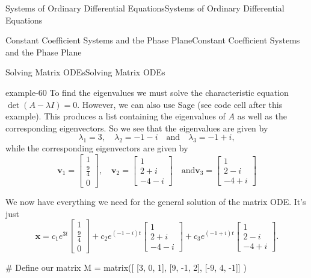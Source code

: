 \documentclass[10pt,]{book}
\numberwithin{equation}{section}
\renewcommand{\vec}[1]{\mathbf{#1}}
\begin{document}
\begin{chapterptx}{Systems of Ordinary Differential Equations}{}{Systems of Ordinary Differential Equations}{}{}
\begin{sectionptx}{Constant Coefficient Systems and the Phase Plane}{}{Constant Coefficient Systems and the Phase Plane}{}{}
\begin{subsectionptx}{Solving Matrix ODEs}{}{Solving Matrix ODEs}{}{}
\begin{example}{}{example-60}
\hypertarget{p-357}{}%
To find the eigenvalues we must solve the characteristic equation \(\det(A-\lambda I)=0\). However, we can also use Sage (see code cell after this example). This produces a list containing the eigenvalues of \(A\) as well as the corresponding eigenvectors. So we see that the eigenvalues are given by%
\begin{equation*}
\lambda_{1} = 3, \quad\lambda_{2} = -1 - i\quad\text{and}\quad\lambda_{3} = -1 + i,
\end{equation*}
while the corresponding eigenvectors are given by%
\begin{equation*}
\vec{v}_{1} = \begin{bmatrix}1 \\ \frac{9}{4} \\ 0\end{bmatrix}, \quad\vec{v}_{2} = \begin{bmatrix} 1 \\ 2 + i \\ -4 - i \end{bmatrix}\quad\text{and}\vec{v}_{3} = \begin{bmatrix} 1 \\ 2 - i \\ -4 + i \end{bmatrix}
\end{equation*}
%
\par
\hypertarget{p-358}{}%
We now have everything we need for the general solution of the matrix ODE. It's just%
\begin{equation*}
\vec{x} = c_{1}e^{3t}\begin{bmatrix}1 \\ \frac{9}{4} \\ 0\end{bmatrix} + c_{2}e^{(-1 - i)t}\begin{bmatrix} 1 \\ 2 + i \\ -4 - i \end{bmatrix} + c_{3}e^{(-1 + i)t}\begin{bmatrix} 1 \\ 2 - i \\ -4 + i \end{bmatrix}.
\end{equation*}
%
\end{example}
\begin{sageinput}
# Define our matrix
M = matrix([ [3, 0, 1],
             [9, -1, 2],
             [-9, 4, -1]] )


\end{sageinput}
\end{subsectionptx}
\end{sectionptx}
\end{chapterptx}
\end{document}
